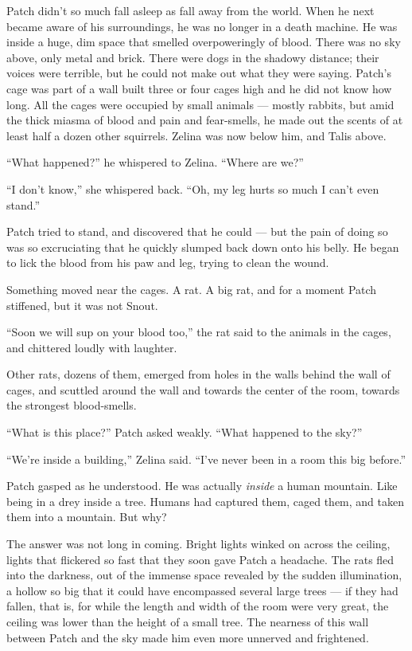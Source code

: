 \documentclass[ebook,oneside,openany,17pt]{memoir}
\begin{document}
Patch didn’t so much fall asleep as fall away from the world. When he
next became aware of his surroundings, he was no longer in a death
machine. He was inside a huge, dim space that smelled overpoweringly
of blood. There was no sky above, only metal and brick. There were
dogs in the shadowy distance; their voices were terrible, but he could
not make out what they were saying. Patch’s cage was part of a wall
built three or four cages high and he did not know how long. All the
cages were occupied by small animals — mostly rabbits, but amid the
thick miasma of blood and pain and fear-smells, he made out the scents
of at least half a dozen other squirrels. Zelina was now below him,
and Talis above.

“What happened?” he whispered to Zelina. “Where are we?”

“I don’t know,” she whispered back. “Oh, my leg hurts so much I can’t
even stand.”

Patch tried to stand, and discovered that he could — but the pain of
doing so was so excruciating that he quickly slumped back down onto
his belly. He began to lick the blood from his paw and leg, trying to
clean the wound.

Something moved near the cages. A rat. A big rat, and for a moment
Patch stiffened, but it was not Snout.

“Soon we will sup on your blood too,” the rat said to the animals in
the cages, and chittered loudly with laughter.

Other rats, dozens of them, emerged from holes in the walls behind the
wall of cages, and scuttled around the wall and towards the center of
the room, towards the strongest blood-smells.

“What is this place?” Patch asked weakly. “What happened to the sky?”

“We’re inside a building,” Zelina said. “I’ve never been in a room
this big before.”

Patch gasped as he understood. He was actually \emph{inside} a human
mountain. Like being in a drey inside a tree. Humans had captured
them, caged them, and taken them into a mountain. But why?

The answer was not long in coming. Bright lights winked on across the
ceiling, lights that flickered so fast that they soon gave Patch a
headache. The rats fled into the darkness, out of the immense space
revealed by the sudden illumination, a hollow so big that it could
have encompassed several large trees — if they had fallen, that is,
for while the length and width of the room were very great, the
ceiling was lower than the height of a small tree. The nearness of
this wall between Patch and the sky made him even more unnerved and
frightened.
\end{document}

